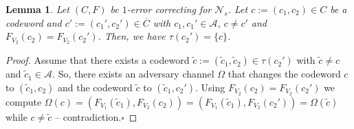 \documentclass[11pt]{article}
\newcommand{\cA}{\mathcal{A}}
\newcommand{\cN}{\mathcal{N}}
\newtheorem{lemma}[theorem]{Lemma}
\begin{document}

\begin{lemma}
  \label{lemma_codewords_c_2}
  Let $(C,F)$ be $1$-error correcting for $\cN_s$. Let $c:=\left(c_1,c_2\right)\in C$ be a codeword and $c':=\left(c_1',c_2'\right)\in \overline{C}$ with $c_1,c_1'\in\cA$, $c\neq c'$ and 
  $F_{V_2}(c_2)= F_{V_2}(c_2')$. Then, we have $\tau(c_2')=\{c\}$.
\end{lemma}  
\begin{proof}
  Assume that there exists a codeword $\tilde{c}:=\left(\tilde{c}_1,\tilde{c}_2\right)\in\tau(c_2')$ with $\tilde{c}\neq c$ and $\tilde{c}_1\in\cA$. 
  So, there exists an adversary channel $\Omega$ that changes the codeword $c$ to $(\tilde{c}_1,c_2)$ and the codeword $\tilde{c}$ to $(\tilde{c}_1,c_2')$. 
  Using $F_{V_2}(c_2)=F_{V_2}(c_2')$ we compute $\Omega(c)=\left(F_{V_1}(\tilde{c}_1),F_{V_2}(c_2)\right)=\left(F_{V_1}(\tilde{c}_1),F_{V_2}(c_2')\right)=\Omega(\tilde{c})$ 
  while $c\neq \tilde{c}$ -- contradiction.\hfill{$\square$}   
\end{proof}  
\end{document}
